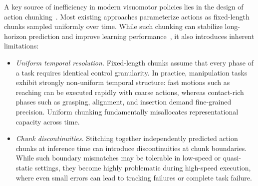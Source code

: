 
A key source of inefficiency in modern visuomotor policies lies in the design of action chunking~\cite{dp,act}. Most existing approaches parameterize actions as fixed-length chunks sampled uniformly over time. While such chunking can stabilize long-horizon prediction and improve learning performance~\cite{mobile-aloha}, it also introduces inherent limitations: 
\vspace{-5pt}

\begin{itemize}[leftmargin=3mm]
    \item \textit{Uniform temporal resolution.} 
    Fixed-length chunks assume that every phase of a task requires identical control granularity. In practice, manipulation tasks exhibit strongly non-uniform temporal structure: fast motions such as reaching can be executed rapidly with coarse actions, whereas contact-rich phases such as grasping, alignment, and insertion demand fine-grained precision. Uniform chunking fundamentally misallocates representational capacity across time.
\end{itemize}
\vspace{-5pt}

\begin{itemize}[leftmargin=3mm]
    \item \textit{Chunk discontinuities.} 
    Stitching together independently predicted action chunks at inference time can introduce discontinuities at chunk boundaries. While such boundary mismatches may be tolerable in low-speed or quasi-static settings, they become highly problematic during high-speed execution, where even small errors can lead to tracking failures or complete task failure.
\end{itemize}

